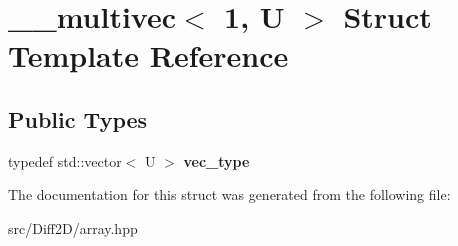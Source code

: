 \hypertarget{struct____multivec_3_011_00_01U_01_4}{\section{\-\_\-\-\_\-multivec$<$ 1, U $>$ Struct Template Reference}
\label{struct____multivec_3_011_00_01U_01_4}
}
\subsection*{Public Types}
\begin{DoxyCompactItemize}
\item 
\hypertarget{struct____multivec_3_011_00_01U_01_4_abdf795a9397affa66935fdcc0f011188}{typedef std\-::vector$<$ U $>$ {\bfseries vec\-\_\-type}}\label{struct____multivec_3_011_00_01U_01_4_abdf795a9397affa66935fdcc0f011188}

\end{DoxyCompactItemize}


The documentation for this struct was generated from the following file\-:\begin{DoxyCompactItemize}
\item 
src/\-Diff2\-D/array.\-hpp\end{DoxyCompactItemize}
